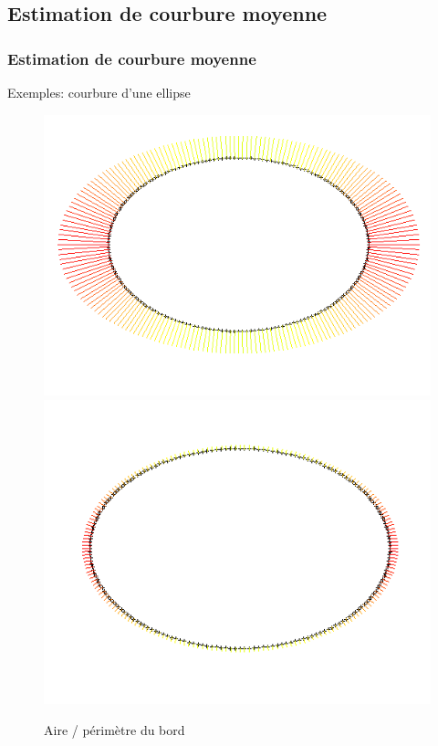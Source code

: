 \documentclass{beamer}
\begin{document}
\subsection{Estimation de courbure moyenne}
\begin{frame}
    \frametitle{Estimation de courbure moyenne}

    Exemples: courbure d'une ellipse
    \begin{figure}
        \centering
        \includegraphics[scale=0.3]{img/curvature-ellipse-200-15-area}
        \includegraphics[scale=0.3]{img/curvature-ellipse-200-15-perimeter}
        \caption{Aire / périmètre du bord}
    \end{figure}
\end{frame}
\end{document}
